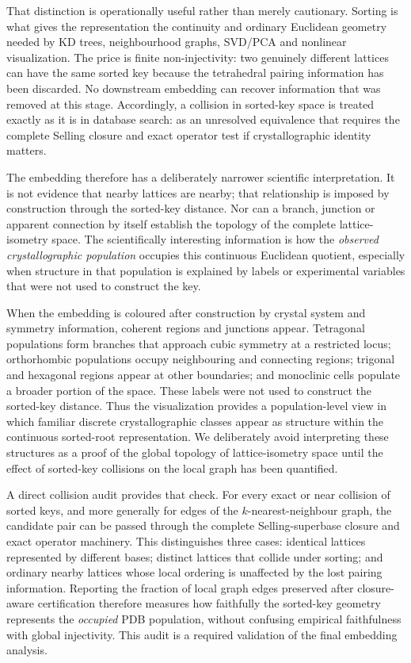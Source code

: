 \documentclass[11pt]{article}
\begin{document}
That distinction is operationally useful rather than merely cautionary. Sorting is what gives the representation the continuity and ordinary Euclidean geometry needed by KD trees, neighbourhood graphs, SVD/PCA and nonlinear visualization. The price is finite non-injectivity: two genuinely different lattices can have the same sorted key because the tetrahedral pairing information has been discarded. No downstream embedding can recover information that was removed at this stage. Accordingly, a collision in sorted-key space is treated exactly as it is in database search: as an unresolved equivalence that requires the complete Selling closure and exact operator test if crystallographic identity matters.

The embedding therefore has a deliberately narrower scientific interpretation. It is not evidence that nearby lattices are nearby; that relationship is imposed by construction through the sorted-key distance. Nor can a branch, junction or apparent connection by itself establish the topology of the complete lattice-isometry space. The scientifically interesting information is how the \emph{observed crystallographic population} occupies this continuous Euclidean quotient, especially when structure in that population is explained by labels or experimental variables that were not used to construct the key.

When the embedding is coloured after construction by crystal system and symmetry information, coherent regions and junctions appear. Tetragonal populations form branches that approach cubic symmetry at a restricted locus; orthorhombic populations occupy neighbouring and connecting regions; trigonal and hexagonal regions appear at other boundaries; and monoclinic cells populate a broader portion of the space. These labels were not used to construct the sorted-key distance. Thus the visualization provides a population-level view in which familiar discrete crystallographic classes appear as structure within the continuous sorted-root representation. We deliberately avoid interpreting these structures as a proof of the global topology of lattice-isometry space until the effect of sorted-key collisions on the local graph has been quantified.

A direct collision audit provides that check. For every exact or near collision of sorted keys, and more generally for edges of the $k$-nearest-neighbour graph, the candidate pair can be passed through the complete Selling-superbase closure and exact operator machinery. This distinguishes three cases: identical lattices represented by different bases; distinct lattices that collide under sorting; and ordinary nearby lattices whose local ordering is unaffected by the lost pairing information. Reporting the fraction of local graph edges preserved after closure-aware certification therefore measures how faithfully the sorted-key geometry represents the \emph{occupied} PDB population, without confusing empirical faithfulness with global injectivity. This audit is a required validation of the final embedding analysis.
\end{document}
